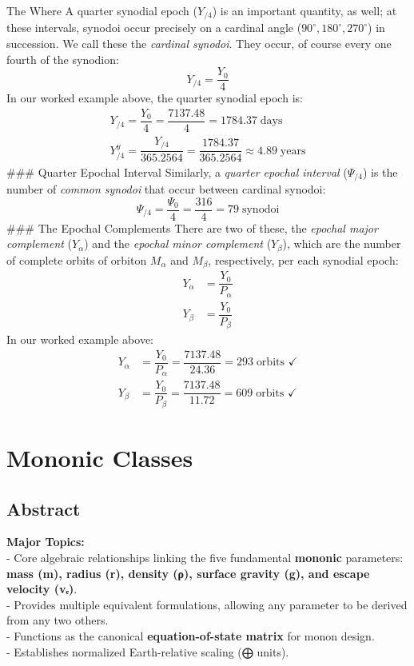 \documentclass[
  letterpaper,
]{book}
\begin{document}
The Where A quarter synodial epoch (\(Y_{/4}\)) is an important
quantity, as well; at these intervals, synodoi occur precisely on a
cardinal angle (\(90^\circ, 180^\circ, 270^\circ\)) in succession. We
call these the \emph{cardinal synodoi}. They occur, of course every one
fourth of the synodion: \[
Y_{/4} = \dfrac{Y_0}{4}
\] In our worked example above, the quarter synodial epoch is: \[
\begin{gather}
Y_{/4} = \dfrac{Y_0}{4} = \dfrac{7137.48}{4} = 1784.37\; \text{days} \\[0.5em]
Y_{/4}^y = \dfrac{Y_{/4}}{365.2564} = \dfrac{1784.37}{365.2564} ≈ 4.89\; \text{years}
\end{gather}
\] \#\#\# Quarter Epochal Interval Similarly, a \emph{quarter epochal
interval} (\(\Psi_{/4}\)) is the number of \emph{common synodoi} that
occur between cardinal synodoi: \[
\Psi_{/4} = \dfrac{\Psi_0}{4} = \dfrac{316}{4} = 79\; \text{synodoi}
\] \#\#\# The Epochal Complements There are two of these, the
\emph{epochal major complement} (\(Y_\alpha\)) and the \emph{epochal
minor complement} (\(Y_\beta\)), which are the number of complete orbits
of orbiton \(M_\alpha\) and \(M_\beta\), respectively, per each synodial
epoch: \[
\begin{align}
Y_\alpha &= \dfrac{Y_0}{P_\alpha} \\[1em]
Y_\beta &= \dfrac{Y_0}{P_\beta}
\end{align}
\] In our worked example above: \[
\begin{align}
Y_\alpha &= \dfrac{Y_0}{P_\alpha} = \dfrac{7137.48}{24.36} = 293\; \text{orbits }✓ \\[1em]
Y_\beta &= \dfrac{Y_0}{P_\beta} = \dfrac{7137.48}{11.72} = 609\; \text{orbits }✓
\end{align}
\]

\part{Mononic Classes}

\chapter{Abstract}\label{abstract-35}

\textbf{Major Topics:}\\
- Core algebraic relationships linking the five fundamental
\textbf{mononic} parameters: \textbf{mass (m), radius (r), density (ρ),
surface gravity (g), and escape velocity (vₑ)}.\\
- Provides multiple equivalent formulations, allowing any parameter to
be derived from any two others.\\
- Functions as the canonical \textbf{equation-of-state matrix} for monon
design.\\
- Establishes normalized Earth-relative scaling (⨁ units).
\end{document}
